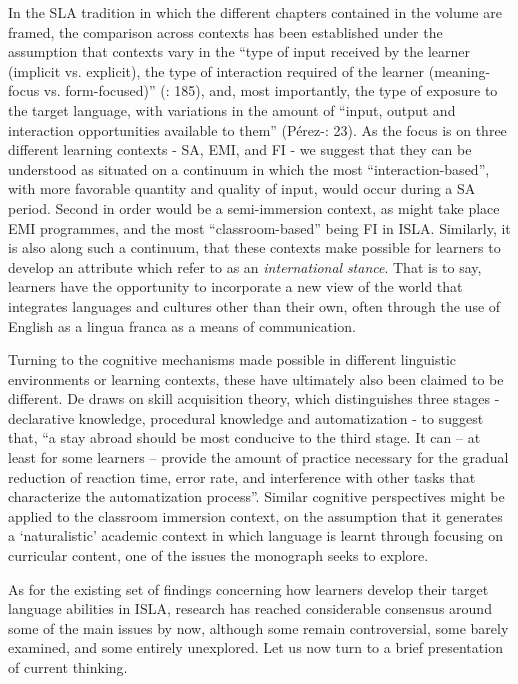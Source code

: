 In the SLA tradition in which the different chapters contained in the volume are framed, the comparison across contexts has been established under the assumption that contexts vary in the “type of input received by the learner (implicit vs. explicit), the type of interaction required of the learner (meaning-focus vs. form-focused)” (\citealt{LeonardShea2015}: 185), and, most importantly, the type of exposure to the target language, with variations in the amount of “input, output and interaction opportunities available to them” (Pérez-\citealt{Vidal2014}: 23). As the focus is on three different learning contexts - SA, EMI, and FI - we suggest that they can be understood as situated on a continuum in which the most “interaction-based”, with more favorable quantity and quality of input, would occur during a SA period. Second in order would be a semi-immersion context, as might take place EMI programmes, and the most “classroom-based” being FI in ISLA. Similarly, it is also along such a continuum, that these contexts make possible for learners to develop an attribute which \citet{UshiodaDörnyei2012} refer to as an \textit{international} \textit{stance}. That is to say, learners have the opportunity to incorporate a new view of the world that integrates languages and cultures other than their own, often through the use of English as a lingua franca as a means of communication.

Turning to the cognitive mechanisms made possible in different linguistic environments or learning contexts, these have ultimately also been claimed to be different. De\citet[213]{Keyser2007} draws on skill acquisition theory, which distinguishes three stages -  declarative knowledge, procedural knowledge and automatization -  to suggest that, “a stay abroad should be most conducive to the third stage. It can – at least for some learners – provide the amount of practice necessary for the gradual reduction of reaction time, error rate, and interference with other tasks that characterize the automatization process”. Similar cognitive perspectives might be applied to the classroom immersion context, on the assumption that it generates a ‘naturalistic’ academic context in which language is learnt through focusing on curricular content, one of the issues the monograph seeks to explore. 

As for the existing set of findings concerning how learners develop their target language abilities in ISLA, research has reached considerable consensus around some of the main issues by now, although some remain controversial, some barely examined, and some entirely unexplored. Let us now turn to a brief presentation of current thinking.  

